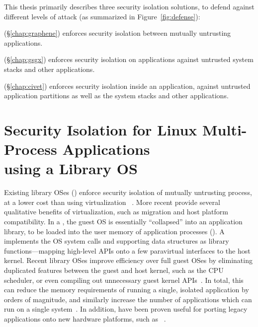 This thesis primarily describes three security isolation solutions,
to defend against different levels of attack (as summarized in Figure~\ref{fig:defense}):
\begin{compactitem}
\item {\em \graphene{}} (\S\ref{chap:graphene}) enforces security isolation between mutually untrusting applications.
\item {\em \gsgx{}} (\S\ref{chap:gsgx}) enforces security isolation on applications against untrusted system stacks and other applications.
\item {\em \civet{}} (\S\ref{chap:civet}) enforces security isolation inside an application, against untrusted application partitions as well as the system stacks and other applications.
\end{compactitem}

\section{Security Isolation for Linux Multi-Process Applications\\ using a Library OS}
\label{sec:intro:graphene}

Existing library OSes (\libos{}) enforce security isolation of mutually untrusting process,
at a lower cost than using virtualization
~\citep{porter11drawbridge,unikernels,baumann13bascule}.
More recent \liboses{}
provide several qualitative benefits of virtualization,
such as migration and host platform compatibility.
In a \libos{}, the guest OS is essentially ``collapsed''
into an application library, to be loaded into the user memory of application processes ({\em \picoprocs{}}).
A \libos{} implements the OS system calls and supporting data structures as library functions---mapping
high-level APIs onto
a few paravirtual interfaces to the host kernel.
Recent library OSes improve efficiency over full guest OSes by eliminating duplicated features
between the guest and host kernel,
such as the CPU scheduler, or
even compiling out unnecessary guest kernel APIs~\citep{unikernels}.
In total, this can reduce the memory requirements of running a single, isolated application
by orders of magnitude, and similarly
increase the number of applications which can run
on a single system~\citep{porter11drawbridge,unikernels}.
In addition, \liboses{} have been proven
useful for porting legacy applications
onto new hardware platforms, such as \intel{} \sgx{}~\citep{baumann14haven}.

